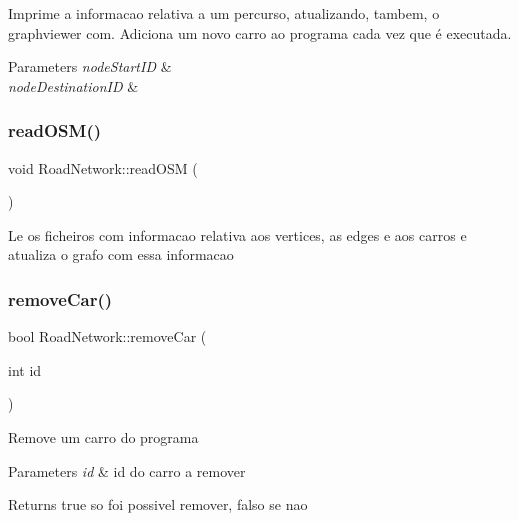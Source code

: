 Imprime a informacao relativa a um percurso, atualizando, tambem, o graphviewer com. Adiciona um novo carro ao programa cada vez que é executada. 
\begin{DoxyParams}{Parameters}
{\em node\+Start\+ID} & \\
\hline
{\em node\+Destination\+ID} & \\
\hline
\end{DoxyParams}
\mbox{\label{class_road_network_abf74962fc6a63d82efcd0073c48b0d35}} 
\subsubsection{\texorpdfstring{read\+O\+S\+M()}{readOSM()}}
{\footnotesize\ttfamily void Road\+Network\+::read\+O\+SM (\begin{DoxyParamCaption}{ }\end{DoxyParamCaption})}

Le os ficheiros com informacao relativa aos vertices, as edges e aos carros e atualiza o grafo com essa informacao \mbox{\label{class_road_network_a47cedd456d5f101e2759237f65bb0ff1}} 
\subsubsection{\texorpdfstring{remove\+Car()}{removeCar()}}
{\footnotesize\ttfamily bool Road\+Network\+::remove\+Car (\begin{DoxyParamCaption}\item[{int}]{id }\end{DoxyParamCaption})}

Remove um carro do programa 
\begin{DoxyParams}{Parameters}
{\em id} & id do carro a remover \\
\hline
\end{DoxyParams}
\begin{DoxyReturn}{Returns}
true so foi possivel remover, falso se nao 
\end{DoxyReturn}
\mbox{\label{class_road_network_a981b13a5dcab7fb5a1089d0a53fc788d}} 
